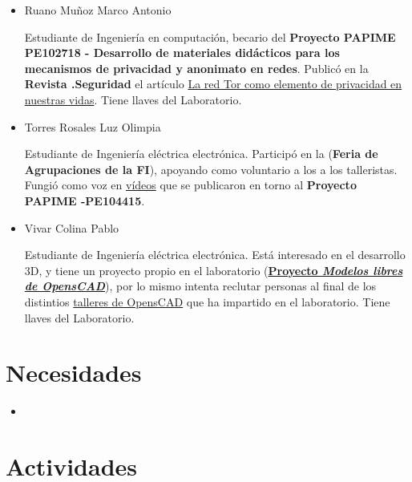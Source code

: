 \documentclass[a4paper,11pt]{article}                 %
\begin{document}
\begin{itemize}
    \item Ruano Muñoz Marco Antonio
    
    Estudiante de Ingeniería en computación, becario del \textbf{Proyecto PAPIME PE102718 - Desarrollo de materiales didácticos para los mecanismos de privacidad y anonimato en redes}. Publicó en la \textbf{Revista .Seguridad} el artículo \href{https://revista.seguridad.unam.mx/numero30/la-red-tor-como-elemento-de-privacidad-en-nuestras-vidas}{La red Tor como elemento de privacidad en nuestras vidas}. Tiene llaves del Laboratorio.
    
    \item Torres Rosales Luz Olimpia
    
    Estudiante de Ingeniería eléctrica electrónica. Participó en la (\textbf{Feria de Agrupaciones de la FI}), apoyando como voluntario a los a los talleristas. Fungió como voz en \href{https://www.youtube.com/channel/UCwHFqMqxUcCAJSdek3e4zOw}{vídeos} que se publicaron en torno al  \textbf{Proyecto PAPIME -PE104415}.
    
    \item Vivar Colina Pablo
    
    Estudiante de Ingeniería eléctrica electrónica. Está interesado en el desarrollo 3D, y tiene un proyecto propio en el laboratorio (\href{https://github.com/LIDSOL/OpenSCAD-free-models}{\textbf{Proyecto \textit{Modelos libres de OpensCAD}}}), por lo mismo intenta reclutar personas al final de los distintios \href{https://github.com/LIDSOL/OpenSCAD-curso}{talleres de OpensCAD} que ha impartido en el laboratorio. Tiene llaves del Laboratorio.
  \end{itemize}
  
  \section{Necesidades}
  
  \begin{itemize}
    \item 
  \end{itemize}
  \section{Actividades}
  
  
  
   
  


\end{document}
